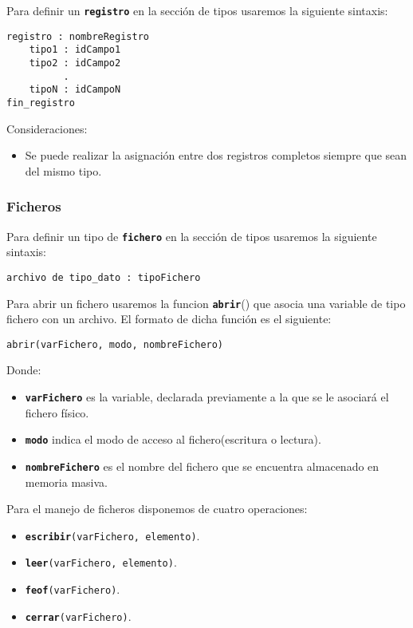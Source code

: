 \documentclass{article}
\newcommand{\pkeyword}[1]{\textcolor{azulpseudo}{\texttt{\textbf{#1}}}}
\begin{document}
Para definir un \pkeyword{registro} en la sección de tipos usaremos la siguiente sintaxis:

\begin{lstlisting}[language = pseudocodigoesp]
registro : nombreRegistro
    tipo1 : idCampo1
    tipo2 : idCampo2
          .
    tipoN : idCampoN 
fin_registro
\end{lstlisting}

Consideraciones:

\begin{itemize}
\item Se puede realizar la asignación entre dos registros completos siempre que sean del mismo tipo.
\end{itemize}
\subsubsection{Ficheros}
Para definir un tipo de \pkeyword{fichero} en la sección de tipos usaremos la siguiente sintaxis:
\begin{lstlisting}[language = pseudocodigoesp]
archivo de tipo_dato : tipoFichero
\end{lstlisting}

Para abrir un fichero usaremos la funcion \pkeyword{abrir}() que asocia una variable de tipo fichero con un archivo. El formato de dicha función es el siguiente:
\begin{lstlisting}[language = pseudocodigoesp]
abrir(varFichero, modo, nombreFichero)
\end{lstlisting}
Donde:
\begin{itemize}
\item\textbf{\texttt{varFichero}} es la variable, declarada previamente a la que se le asociará el fichero físico.
\item\textbf{\texttt{modo}} indica el modo de acceso al fichero(escritura o lectura).
\item\textbf{\texttt{nombreFichero}} es el nombre del fichero que se encuentra almacenado en memoria masiva.
\end{itemize}

Para el manejo de ficheros disponemos de cuatro operaciones:

\begin{itemize}
\item \pkeyword{escribir}\texttt{(varFichero, elemento)}.
\item \pkeyword{leer}\texttt{(varFichero, elemento)}.
\item \pkeyword{feof}\texttt{(varFichero)}.
\item \pkeyword{cerrar}\texttt{(varFichero)}.
\end{itemize}
\end{document}
